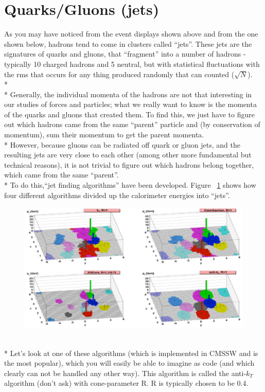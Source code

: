\section{Quarks/Gluons (jets)}
As you may have noticed from the event displays shown above and from the one shown below, hadrons tend to come in clusters called ``jets''. These jets are the signatures of quarks and gluons, that ``fragment'' into a number of hadrons - typically 10 charged hadrons and 5 neutral, but with statistical fluctuations with the rms that occurs for any thing produced randomly that can counted ($\sqrt{N}$).
\\*
\\*
Generally, the individual momenta of the hadrons are not that interesting in our studies of forces and particles; what we really want to know is the momenta of the quarks and gluons that created them. To find this, we just have to figure out which hadrons came from the same ``parent'' particle and (by conservation of momentum), sum their momentum to get the parent momenta.
\\*
\noindent
However, because gluons can be radiated off quark or gluon jets, and the resulting jets are very close to each other (among other more fundamental but technical reasons), it is not trivial to figure out which hadrons belong together, which came from the same ``parent''.
\\*
To do this,``jet finding algorithms'' have been developed. Figure ~\ref{fig:pid5} shows how four different algorithms divided up the calorimeter energies into ``jets''.
\begin{figure}[h]
\centering\includegraphics[scale=0.6]{./particleID/Pictures/fig5.pdf}
\label{fig:pid5}
\end{figure}
\\*
\noindent
Let's look at one of these algorithms (which is implemented in CMSSW and is the most popular), which you will easily be able to imagine as code (and which clearly can not be handled any other way).  This algorithm is called the anti-$k_{T}$ algorithm (don't ask) with cone-parameter R. R is typically chosen to be 0.4.
